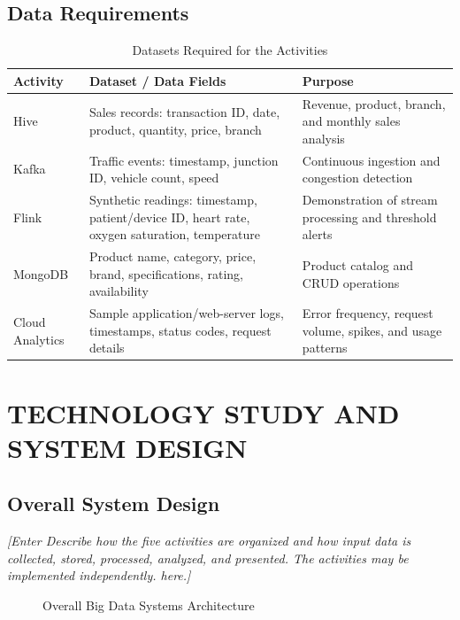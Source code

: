 \documentclass[12pt,a4paper]{report}
\newcommand{\placeholder}[1]{\textit{[Enter #1 here.]}}
\begin{document}
\section{Data Requirements}
\begin{table}[H]
\centering
\caption{Datasets Required for the Activities}
\begin{tabularx}{\textwidth}{|l|X|X|}
\hline
\textbf{Activity} & \textbf{Dataset / Data Fields} & \textbf{Purpose}\\
\hline
Hive & Sales records: transaction ID, date, product, quantity, price, branch & Revenue, product, branch, and monthly sales analysis\\
\hline
Kafka & Traffic events: timestamp, junction ID, vehicle count, speed & Continuous ingestion and congestion detection\\
\hline
Flink & Synthetic readings: timestamp, patient/device ID, heart rate, oxygen saturation, temperature & Demonstration of stream processing and threshold alerts\\
\hline
MongoDB & Product name, category, price, brand, specifications, rating, availability & Product catalog and CRUD operations\\
\hline
Cloud Analytics & Sample application/web-server logs, timestamps, status codes, request details & Error frequency, request volume, spikes, and usage patterns\\
\hline
\end{tabularx}
\end{table}

\chapter{TECHNOLOGY STUDY AND SYSTEM DESIGN}

\section{Overall System Design}
\placeholder{Describe how the five activities are organized and how input
data is collected, stored, processed, analyzed, and presented. The activities
may be implemented independently.}

\begin{figure}[H]
    \centering
    \caption{Overall Big Data Systems Architecture}
    \label{fig:overall_architecture}
\end{figure}
\end{document}
